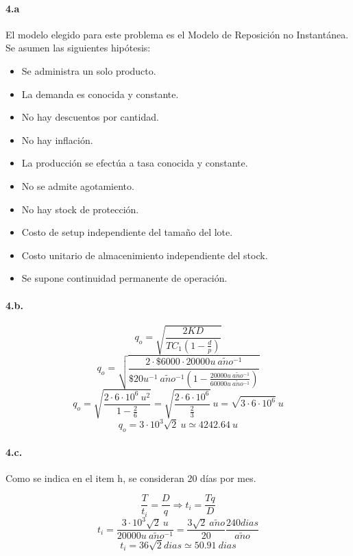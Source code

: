 \documentclass{article}
\def \anio {a\tilde{n}o}
\begin{document}
    \paragraph{4.a}
    El modelo elegido para este problema es el Modelo de Reposición no Instantánea. Se asumen las siguientes hipótesis:
        \begin{itemize}
            \item Se administra un solo producto.
            \item La demanda es conocida y constante.
            \item No hay descuentos por cantidad.
            \item No hay inflación.
            \item La producción se efectúa a tasa conocida y constante.
            \item No se admite agotamiento.
            \item No hay stock de protección.
            \item Costo de setup independiente del tamaño del lote.
            \item Costo unitario de almacenimiento independiente del stock.
            \item Se supone continuidad permanente de operación.
        \end{itemize}

    \paragraph{4.b.} 
        $$ q_o = \sqrt{ \frac{2KD}{TC_1 \left( 1 - \frac{d}{p} \right)} } $$
        $$ q_o = \sqrt{ \frac{2 \cdot \$ 6000 \cdot 20000u\ \anio^{-1}}{\$20 u^{-1}\ \anio^{-1} \left( 1 - \frac{20000u\ \anio^{-1}}{60000u\ \anio^{-1}} \right)} } $$
        $$ q_o = \sqrt{ \frac{2 \cdot 6 \cdot 10^6\ u^2}{1 - \frac{2}{6}} } = \sqrt{ \frac{2 \cdot 6 \cdot 10^6}{\frac{2}{3}} }\ u = \sqrt{ 3 \cdot 6 \cdot 10^6 }\ u $$
        $$ \boxed{ q_o = 3 \cdot 10^3 \sqrt {2}\ u \simeq 4242.64\ u } $$

    \paragraph{4.c.}
        Como se indica en el item h, se consideran 20 días por mes.
        
        $$ \frac{T}{t_i} = \frac{D}{q} \Rightarrow t_i = \frac{Tq}{D} $$
        $$ t_i = \frac{3 \cdot 10^3 \sqrt{2}\ u}{20000u\ \anio^{-1}} = \frac{3 \sqrt{2}\ \anio}{20} \frac{240 dias}{\anio} $$
        $$ \boxed{ t_i = 36 \sqrt{2} dias \simeq 50.91\ dias } $$
    
\end{document}
